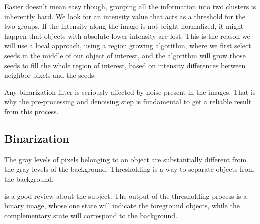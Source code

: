 Easier doesn't mean easy though, grouping all the information into two clusters is inherently hard.
We look for an intensity value that acts as a threshold for the two groups.
If the intensity along the image is not bright-normalized, it might happen that objects with absolute lower intensity are lost.
This is the reason we will use a local approach, using a region growing algorithm, where we first select seeds in the middle of our object of interest, and the algorithm will grow those seeds to fill the whole region of interest, based on intensity differences between neighbor pixels and the seeds.

Any binarization filter is seriously affected by noise present in the images. That is why the pre-processing and denoising step is fundamental to get a reliable result from this process.

\subsection{Binarization}
\label{sub:binarization}
The gray levels of pixels belonging to an object are substantially
different from the gray levels of the background. Thresholding is a way to
separate objects from the background.

\citet{sezgin_survey_2004} is a good review about the subject. The output of the
thresholding process is a binary image, whose one state will indicate the
foreground objects, while the complementary state will correspond to the
background.

